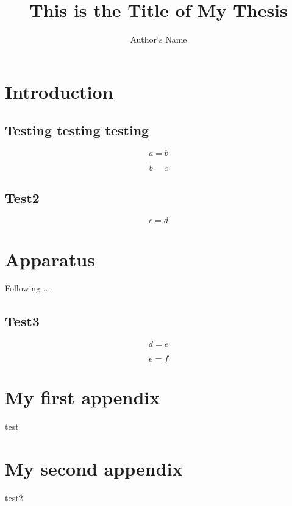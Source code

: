 \documentclass[english,linenumber]{thesis}
\title{This is the Title of My Thesis}
\author{Author's Name}
\begin{document}
\maketitle

\frontmatter


\chapter{Introduction}


\section{Testing testing testing}

\begin{equation}
a=b\label{eq:eq1}\end{equation}


\begin{equation}
b=c\label{eq:eq2}\end{equation}



\section{Test2}


\begin{equation}
c=d\label{eq:eq3}\end{equation}



\chapter{Apparatus}

Following \citet{marsh2012} ...

\section{Test3}

\begin{equation}
d=e\label{eq:eq4}\end{equation}


\begin{equation}
e=f\label{eq:eq5}\end{equation}



% 
% 


\uofsappendix

\begin{appendices}
\chapter{My first appendix}
test

\chapter{My second appendix}
test2
\end{appendices}
 
\end{document}
